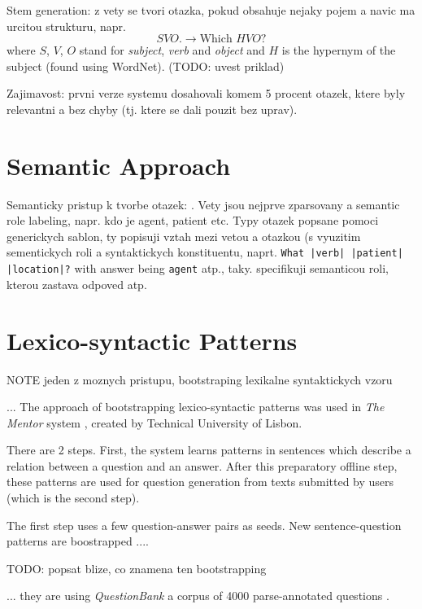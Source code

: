 \documentclass[a4paper, 12pt, twoside]{fithesis2}		%
\renewcommand{\_}{\leavevmode \kern0.0em\vbox{\hrule width0.4em}}
\begin{document}
Stem generation: z vety se tvori otazka, pokud obsahuje nejaky pojem a navic ma urcitou strukturu, napr.
$$
S V O \text{.} \longrightarrow \text{Which } H V O \text{?}
$$
where $S$, $V$, $O$ stand for \textit{subject}, \textit{verb} and \textit{object} and $H$ is the hypernym of the subject (found using WordNet). (TODO: uvest priklad)

Zajimavost: prvni verze systemu dosahovali komem 5 procent otazek, ktere byly relevantni a bez chyby (tj. ktere se dali pouzit bez uprav).


\section{Semantic Approach}
\label{sec:questions-semantically}

Semanticky pristup k tvorbe otazek: \cite{questions-eval}.
Vety jsou nejprve zparsovany a semantic role labeling, napr. kdo je agent, patient etc.
Typy otazek popsane pomoci generickych sablon, ty popisuji vztah mezi vetou a otazkou (s vyuzitim sementickych roli a syntaktickych konstituentu, naprt. \texttt{What |verb| |patient| |location|?} with answer being \texttt{agent} atp., taky. specifikuji semanticou roli, kterou zastava odpoved atp.


\section{Lexico-syntactic Patterns}
\label{sec:lexico-syntactic-patterns}


NOTE jeden z moznych pristupu, bootstraping lexikalne syntaktickych vzoru

... The approach of bootstrapping lexico-syntactic patterns was used
in \textit{The Mentor} system \cite{mentor}, created by Technical University of Lisbon.

There are 2 steps.
First, the system learns patterns in sentences which describe a relation between a question and an answer.
After this preparatory offline step, these patterns are used for question generation from texts submitted by users (which is the second step).

The first step uses a few question-answer pairs as seeds.
New sentence-question patterns are boostrapped ....

TODO: popsat blize, co znamena ten bootstrapping

... they are using \textit{QuestionBank} a corpus of 4000 parse-annotated questions \cite{question-bank}.
\end{document}
